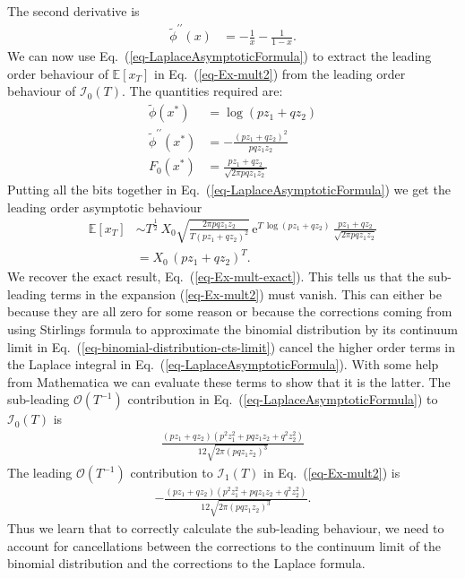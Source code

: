 \documentclass[11pt]{article}
\begin{document}
The second derivative is
\begin{align*}
\widetilde{\phi}^{\prime\prime} (x) &= -\frac{1}{x} - \frac{1}{1-x}.
\end{align*}
We can now use Eq.~(\ref{eq-LaplaceAsymptoticFormula}) to extract the leading order behaviour
of  $\mathbb{E}\left[x_T \right]$ in Eq.~(\ref{eq-Ex-mult2}) from the leading order behaviour of $\mathcal{I}_0(T)$. The quantities required are:
\begin{align}
\widetilde{\phi} (x^*) & = \log\left( p z_1 + q z_2 \right)\\ 
\widetilde{\phi}^{\prime\prime} (x^*) &= - \frac{(p z_1 + q z_2)^2}{ p q z_1 z_2}\\
F_0(x^*) & = \frac{p z_1 + q z_2}{\sqrt{2 \pi p q z_1 z_2 }}
\end{align}
Putting all the bits together in  Eq.~(\ref{eq-LaplaceAsymptoticFormula}) we get the leading order asymptotic behaviour
\begin{align}
\nonumber \mathbb{E}\left[x_T \right] &\sim T^\frac{1}{2} \, X_0 \sqrt{\frac{2 \pi p q z_1 z_2}{T (p z_1 + q z_2)^2}} \,\mathrm{e}^{T\, \log\left( p z_1 + q z_2 \right)}\,  \frac{p z_1 + q z_2}{\sqrt{2 \pi p q z_1 z_2 }}\\
&= X_0\,  (p z_1 + q z_2)^T.
\end{align}
We recover the exact result, Eq.~(\ref{eq-Ex-mult-exact}). This tells us that the sub-leading terms in the expansion (\ref{eq-Ex-mult2}) must vanish.
This can either be because they are all zero for some reason or because the corrections coming from using Stirlings formula to approximate the binomial distribution by its continuum limit in Eq.~(\ref{eq-binomial-distribution-cts-limit}) cancel the higher order terms in the Laplace integral in Eq.~(\ref{eq-LaplaceAsymptoticFormula}).
With some help from Mathematica we can evaluate these terms to show that it is the latter.
The sub-leading  $\mathcal{O}(T^{-1})$ contribution in Eq.~(\ref{eq-LaplaceAsymptoticFormula}) to $\mathcal{I}_0(T)$ is
\begin{align*}
\frac{ (p z_1 + q z_2)\left(p^2 z_1^2 + p q z_1 z_2 + q^2 z_2^2 \right)}{12 \sqrt{2 \pi  (p q z_1 z_2)^3}}
\end{align*}
The  leading  $\mathcal{O}(T^{-1})$ contribution to $\mathcal{I}_1(T)$ in Eq.~(\ref{eq-Ex-mult2}) is
\begin{align*}
- \frac{ (p z_1 + q z_2)\left(p^2 z_1^2 + p q z_1 z_2 + q^2 z_2^2 \right)}{12 \sqrt{2 \pi  (p q z_1 z_2)^3}}.
\end{align*}
Thus we learn that to correctly calculate the sub-leading behaviour, we need to account for cancellations between the corrections to the continuum limit of the binomial distribution and the corrections to the Laplace formula.
\end{document}
